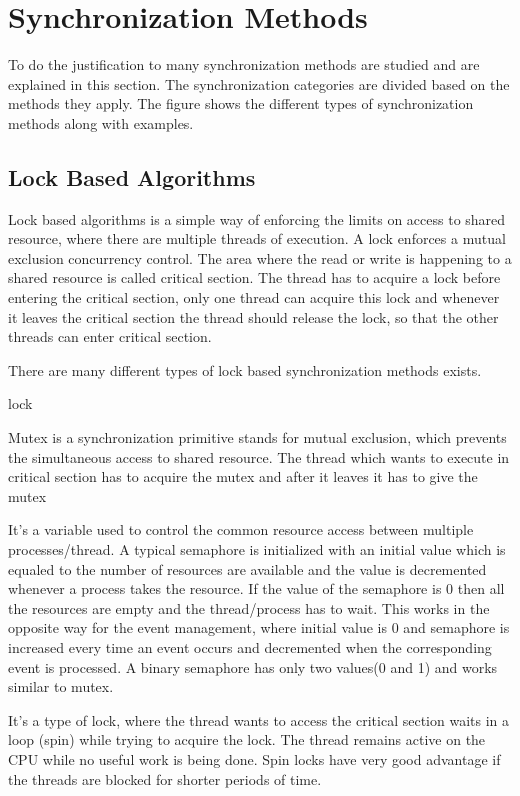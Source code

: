 \section{Synchronization Methods}
To do the justification to many synchronization methods are studied and are explained in this section. The synchronization categories are divided based on the methods they apply. 
The figure %
shows the different types of synchronization methods along with examples. 

\subsection{Lock Based Algorithms}
Lock based algorithms is a simple way of enforcing the limits on access to shared resource, where there are multiple threads of execution. A lock enforces a mutual exclusion concurrency control. The area where the read or write is happening to a shared resource is called critical section. The thread has to acquire a lock before entering the critical section, only one thread can acquire this lock and whenever it leaves the critical section the thread should release the lock, so that the other threads can enter critical section.

There are many different types of lock based synchronization methods exists.

\begin{labeling}{lock}
\item[Mutex] Mutex is a synchronization primitive stands for mutual exclusion, which prevents the simultaneous access to shared resource. The thread which wants to execute in critical section has to acquire the mutex and after it leaves it has to give the mutex 

\item[Semaphore] It's a variable used to control the common resource access between multiple processes/thread. A typical semaphore is initialized with an initial value which is equaled to the number of resources are available and the value is decremented whenever a process takes the resource. If the value of the semaphore is 0 then all the resources are empty and the thread/process has to wait. This works in the opposite way for the event management, where initial value is 0 and semaphore is increased every time an event occurs and decremented when the corresponding event is processed. A binary semaphore has only two values(0 and 1) and works similar to mutex.   

\item[Spin-lock] It's a type of lock, where the thread wants to access the critical section waits in a loop (spin) while trying to acquire the lock. The thread remains active on the CPU while no useful work is being done. Spin locks have very good advantage if the threads are blocked for shorter periods of time.
\end{labeling} 

